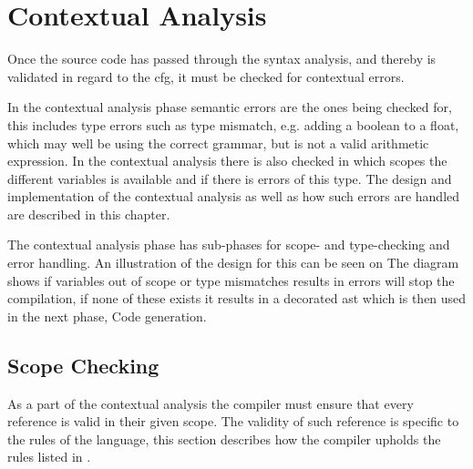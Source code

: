 \chapter{Contextual Analysis}
Once the source code has passed through the syntax analysis, and thereby is validated in regard to the \acrshort{cfg}, it must be checked for contextual errors.

In the contextual analysis phase semantic errors are the ones being checked for, this includes type errors such as type mismatch, e.g. adding a boolean to a float, which may well be using the correct grammar, but is not a valid arithmetic expression.
In the contextual analysis there is also checked in which scopes the different variables is available and if there is errors of this type.
The design and implementation of the contextual analysis as well as how such errors are handled are described in this chapter.

The contextual analysis phase has sub-phases for scope- and type-checking and error handling.
An illustration of the design for this can be seen on 
The diagram shows if variables out of scope or type mismatches results in errors will stop the compilation, if none of these exists it results in a decorated \acrshort{ast} which is then used in the next phase, Code generation.




%


\section{Scope Checking}
As a part of the contextual analysis the compiler must ensure that every reference is valid in their given scope.
The validity of such reference is specific to the rules of the language, this section describes how the compiler upholds the rules listed in .



